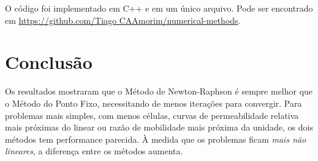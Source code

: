 \documentclass[final,5p]{elsarticle}
\numberwithin{equation}{section}
\begin{document}


        O código foi implementado em C++ e em um único arquivo. Pode ser encontrado em \href{https://github.com/TiagoCAAmorim/numerical-methods/blob/main/12_NewtonRaphson/12_NewtonRaphson.cpp}{https://github.com/Tiago CAAmorim/numerical-methods}.

\section{Conclusão}

            Os resultados mostraram que o Método de Newton-Raphson é sempre melhor que o Método do Ponto Fixo, necessitando de menos iterações para convergir. Para problemas mais simples, com menos células, curvas de permeabilidade relativa mais próximas do linear ou razão de mobilidade mais próxima da unidade, os dois métodos tem performance parecida. À medida que os problemas ficam \emph{mais não lineares}, a diferença entre os métodos aumenta.


\end{document}
